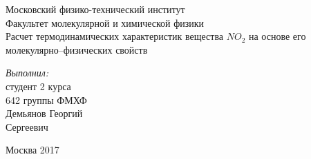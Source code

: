 \begin{titlepage}
\begin{center} 
 
\large Московский физико-технический институт\\
Факультет молекулярной и химической физики\\
\vspace{7cm}
\huge Расчет термодинамических характеристик вещества $NO_2$ на основе его молекулярно--физических свойств
\end{center} 

\vspace{7.5cm}
{\par \raggedleft \large \emph{Выполнил:}\\ студент 2 курса\\ 642 группы ФМХФ\\ Демьянов Георгий\\ Сергеевич \par}
\begin{center}
\vfill Москва 2017
\end{center}
\end{titlepage}
\newpage
\setcounter{page}{2}